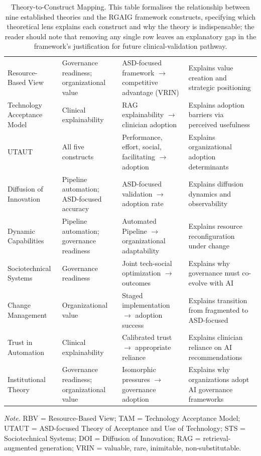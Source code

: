 \begin{table}[!htbp]
\tablestripes\tablefontsize
\tablefontsize
\caption[Theory-to-Construct Mapping]{Theory-to-Construct Mapping. This table formalises the relationship between nine established theories and the RGAIG framework constructs, specifying which theoretical lens explains each construct and why the theory is indispensable; the reader should note that removing any single row leaves an explanatory gap in the framework's justification for future clinical-validation pathway.}
\begin{tabularx}{\textwidth}{@{} >{\raggedright\arraybackslash}p{2.8cm} L L L @{}}
\toprule
{} &  &  &  \\
\midrule
Resource-Based View & Governance readiness; organizational value & ASD-focused framework $\to$ competitive advantage (VRIN) & Explains value creation and strategic positioning \\
\addlinespace
Technology Acceptance Model & Clinical explainability & RAG explainability $\to$ clinician adoption & Explains adoption barriers via perceived usefulness \\
\addlinespace
UTAUT & All five constructs & Performance, effort, social, facilitating $\to$ adoption & Explains organizational adoption determinants \\
\addlinespace
Diffusion of Innovation & Pipeline automation; ASD-focused accuracy & ASD-focused validation $\to$ adoption rate & Explains diffusion dynamics and observability \\
\addlinespace
Dynamic Capabilities & Pipeline automation; governance readiness & Automated Pipeline $\to$ organizational adaptability & Explains resource reconfiguration under change \\
\addlinespace
Sociotechnical Systems & Governance readiness & Joint tech-social optimization $\to$ outcomes & Explains why governance must co-evolve with AI \\
\addlinespace
Change Management & Organizational value & Staged implementation $\to$ adoption success & Explains transition from fragmented to ASD-focused \\
\addlinespace
Trust in Automation & Clinical explainability & Calibrated trust $\to$ appropriate reliance & Explains clinician reliance on AI recommendations \\
\addlinespace
Institutional Theory & Governance readiness; organizational value & Isomorphic pressures $\to$ governance adoption & Explains why organizations adopt AI governance frameworks \\
\bottomrule
\end{tabularx}
\vspace{0.5em}\noindent\textit{Note.} RBV = Resource-Based View; TAM = Technology Acceptance Model; UTAUT = ASD-focused Theory of Acceptance and Use of Technology; STS = Sociotechnical Systems; DOI = Diffusion of Innovation; RAG = retrieval-augmented generation; VRIN = valuable, rare, inimitable, non-substitutable.
\end{table}

